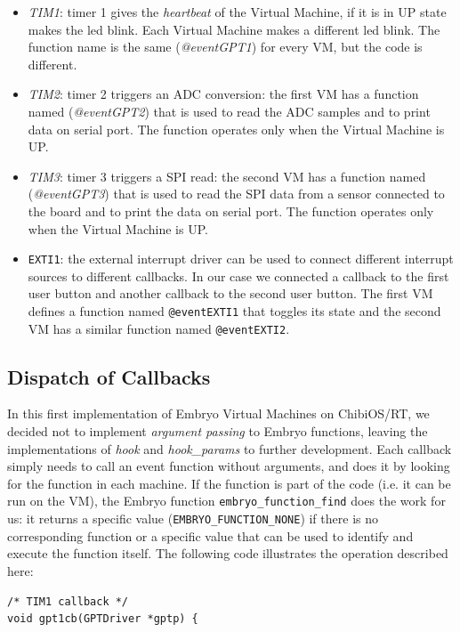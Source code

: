 \documentclass[a4paper,10pt]{article}
\begin{document}
\begin{multicols}{2}
\begin{itemize}
\item \textit{TIM1}: timer 1 gives the \textit{heartbeat} of the Virtual Machine, if it is in UP state makes the led  blink. Each Virtual Machine makes a different led blink. The function name is the same (\textit{@eventGPT1}) for every VM, but the code is different.
\item \textit{TIM2}: timer 2 triggers an ADC conversion: the first VM has a function named (\textit{@eventGPT2}) that is used to read the ADC samples and to print data on serial port. The function operates only when the Virtual Machine is UP.
\item \textit{TIM3}: timer 3 triggers a SPI read: the second VM has a function named (\textit{@eventGPT3}) that is used to read the SPI data from a sensor connected to the board and to print the data on serial port. The function operates only when the Virtual Machine is UP.
\item \texttt{EXTI1}: the external interrupt driver can be used to connect different interrupt sources to different callbacks. In our case we connected a callback to the first user button and another callback to the second user button. The first VM defines a function named \texttt{@eventEXTI1} that toggles its state and the second VM has a similar function named \texttt{@eventEXTI2}.
\end{itemize}

\subsection{Dispatch of Callbacks}
In this first implementation of Embryo Virtual Machines on ChibiOS/RT, we decided not to implement \textit{argument passing} to Embryo functions, leaving the implementations of \textit{hook} and \textit{hook\_params} to further development.\newline
Each callback simply needs to call an event function without arguments, and does it by looking for the function in each machine. If the function is part of the code (i.e. it can be run on the VM), the Embryo function \texttt{embryo\_function\_find} does the work for us: it returns a specific value (\texttt{EMBRYO\_FUNCTION\_NONE}) if there is no corresponding function or a specific value that can be used to identify and execute the function itself.\newline
The following code illustrates the operation described here:
\medskip
\lstset{language=C}
\begin{lstlisting}[caption={Callback looking for a function in VMs}]
/* TIM1 callback */
void gpt1cb(GPTDriver *gptp) {


\end{lstlisting}
\end{multicols}
\end{document}
